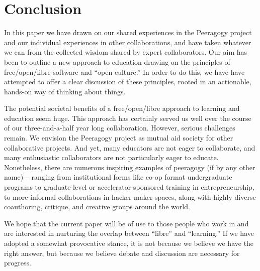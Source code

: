 \section{Conclusion}\label{sec:Conclusion}

In this paper we have drawn on our shared experiences in the Peeragogy
project and our individual experiences in other collaborations, and
have taken whatever we can from the collected wisdom shared by expert
collaborators.  Our aim has been to outline a new approach to
education drawing on the principles of free/open/libre software and
``open culture.''  In order to do this, we have have attempted to
offer a clear discussion of these principles, rooted in an actionable,
hands-on way of thinking about things.

The potential societal benefits of a free/open/libre approach to
learning and education seem huge.  This approach has certainly served
us well over the course of our three-and-a-half year long
collaboration.  However, serious challenges remain.  We envision the
Peeragogy project as mutual aid society for other collaborative
projects.  And yet, many educators are not eager to collaborate, and
many enthusiastic collaborators are not particularly eager to educate.
Nonetheless, there are numerous inspiring examples of peeragogy (if by
any other name) -- ranging from institutional forms like co-op format
undergraduate programs to graduate-level or accelerator-sponsored
training in entrepreneurship, to more informal collaborations in
hacker-maker spaces, along with highly diverse coauthoring, critique,
and creative groups around the world.

We hope that the current paper will be of use to those people who work
in and are interested in nurturing the overlap between ``libre'' and
``learning.''  If we have adopted a somewhat provocative stance, it is
not because we believe we have the right answer, but because we
believe debate and discussion are necessary for progress.


